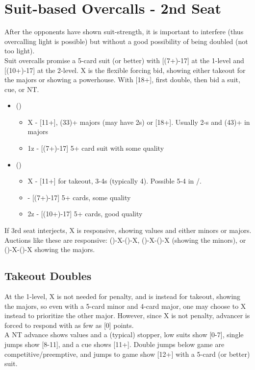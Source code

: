 \documentclass[12pt]{report}
\newcommand{\n}{\\}
\newcommand{\q}[1]{\multido{}{#1}{\qquad}}
\newcommand{\ul}[1]{\begin{itemize}#1\end{itemize}}
\newcommand{\li}[1]{\item[~] \q{#1}}
\begin{document}
\section{Suit-based Overcalls - 2nd Seat} \label{4:2}

    After the opponents have shown suit-strength, it is important to interfere (thus overcalling light is possible) but without a good possibility of being doubled (not too light). \n

    Suit overcalls promise a 5-card suit (or better) with [(7+)-17] at the 1-level and [(10+)-17] at the 2-level.  X is the flexible forcing bid, showing either takeout for the majors or showing a powerhouse.  With [18+], first double, then bid a suit, cue, or NT.

    \ul {
        \li0 ()
        \ul {
            \li0 X - [11+], (33)+ majors (may have 2\di{}s) or [18+].  Usually 2-\cl{}s and (43)+ in majors
            \li0 1z - [(7+)-17] 5+ card suit with some quality
        }
        \li0 (\he1)
        \ul {
            \li0 X - [11+] for takeout, 3-4\sp{}s (typically 4).  Possible 5-4 in \di{}/\sp{}.
            \li0 \sp1 - [(7+)-17] 5+ cards, some quality
            \li0 2z - [(10+)-17] 5+ cards, good quality
        }
    }

    If 3rd seat interjects, X is responsive, showing values and either minors or majors.  Auctions like these are responsive: ()-X-()-X, ()-X-()-X (showing the minors), or ()-X-()-X showing the majors.

\subsection{Takeout Doubles}

    At the 1-level, X is not needed for penalty, and is instead for takeout, showing the majors, so even with a 5-card minor and 4-card major, one may choose to X instead to prioritize the other major. However, since X is not penalty, advancer is forced to respond with as few as [0] points.\n

    A NT advance shows values and a (typical) stopper, low suits show [0-7], single jumps show [8-11], and a cue shows [11+].  Double jumps below game are competitive/preemptive, and jumps to game show [12+] with a 5-card (or better) suit. \n
    
\end{document}
